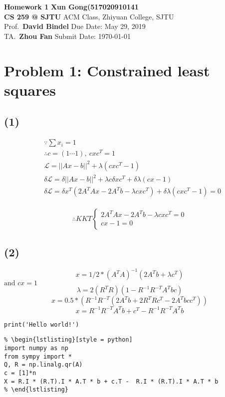 \documentclass[a4paper, 11pt]{article}
\begin{document}
\noindent
\large \textbf{Homework 1} \hfill \textbf{Xun Gong(517020910141} \\
\normalsize {\bf CS 259 @ SJTU} \hfill ACM Class, Zhiyuan College, SJTU\\
Prof.~{\bf David Bindel} \hfill Due Date: May 29, 2019\\
TA.~{\bf Zhou Fan} \hfill Submit Date: \today

\section*{Problem 1: Constrained least squares}

\subsection*{(1)}

\begin{align*}
&\because \sum x_i = 1 \\
&\therefore c = (1 \cdots 1),\ cx c^T = 1 \\
&\mathcal{L} = ||Ax - b||^2 + \lambda (cx c^T - 1) \\
&\delta \mathcal{L} = \delta ||Ax - b||^2 + \lambda c \delta x c^T
                    + \delta \lambda (cx - 1) \\
&\delta \mathcal{L} = \delta x^T (2A^T A x - 2A^T b - \lambda c x c^T) + \delta \lambda (cx c^T - 1) = 0\\
\end{align*}

$$\therefore KKT 
\begin{cases}
    2A^T A x - 2A^T b - \lambda c x c^T = 0 \\
    cx - 1 = 0\\
\end{cases}$$

\subsection*{(2)}

$$x = 1/2 *(A^T A)^{-1} (2 A^T b  + \lambda c^T)$$
$\text{and } cx = 1$
$$\lambda = 2 (R^T R) (1 - R^{-1} R^{-T} A^T b c) $$
$$x = 0.5*(R^{-1}R^{-T}(2A^Tb + 2R^TRc^T - 2A^T b c c^T))$$
$$x = R^{-1}R^{-T}A^Tb + c^T -  R^{-1}R^{-T} A^T b $$


\lstinline[style = python]|print('Hello world!')|
\begin{verbatim}
% \begin{lstlisting}[style = python]
import numpy as np
from sympy import *
Q, R = np.linalg.qr(A)
c = [1]*n
X = R.I * (R.T).I * A.T * b + c.T -  R.I * (R.T).I * A.T * b
% \end{lstlisting}
\end{verbatim}
\end{document}

